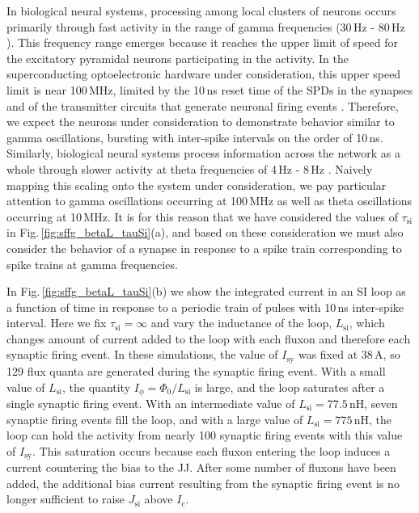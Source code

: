 \documentclass[twocolumn]{article}
\begin{document}
In biological neural systems, processing among local clusters of neurons occurs primarily through fast activity in the range of gamma frequencies (30\,Hz - 80\,Hz \cite{budr2004,bu2006}). This frequency range emerges because it reaches the upper limit of speed for the excitatory pyramidal neurons participating in the activity. In the superconducting optoelectronic hardware under consideration, this upper speed limit is near 100\,MHz, limited by the 10\,ns reset time of the SPDs in the synapses and of the transmitter circuits that generate neuronal firing events \cite{sh2018_full}. Therefore, we expect the neurons under consideration to demonstrate behavior similar to gamma oscillations, bursting with inter-spike intervals on the order of 10\,ns. Similarly, biological neural systems process information across the network as a whole through slower activity at theta frequencies of 4\,Hz - 8\,Hz \cite{budr2004,bu2006}. Naively mapping this scaling onto the system under consideration, we pay particular attention to gamma oscillations occurring at 100\,MHz as well as theta oscillations occurring at 10\,MHz. It is for this reason that we have considered the values of $\tau_{\mathrm{si}}$ in Fig.\,\ref{fig:sffg_betaL_tauSi}(a), and based on these consideration we must also consider the behavior of a synapse in response to a spike train corresponding to spike trains at gamma frequencies. 

In Fig.\,\ref{fig:sffg_betaL_tauSi}(b) we show the integrated current in an SI loop as a function of time in response to a periodic train of pulses with 10\,ns inter-spike interval. Here we fix $\tau_{\mathrm{si}} = \infty$ and vary the inductance of the loop, $L_{\mathrm{si}}$, which changes amount of current added to the loop with each fluxon and therefore each synaptic firing event. In these simulations, the value of $I_{\mathrm{sy}}$ was fixed at 38\,\textmu A, so 129 flux quanta are generated during the synaptic firing event. With a small value of $L_{\mathrm{si}}$, the quantity $I_{\phi} = \Phi_0/L_{\mathrm{si}}$ is large, and the loop saturates after a single synaptic firing event. With an intermediate value of $L_{\mathrm{si}} = 77.5$\,nH, seven synaptic firing events fill the loop, and with a large value of $L_{\mathrm{si}} = 775$\,nH, the loop can hold the activity from nearly 100 synaptic firing events with this value of $I_{\mathrm{sy}}$. This saturation occurs because each fluxon entering the loop induces a current countering the bias to the JJ. After some number of fluxons have been added, the additional bias current resulting from the synaptic firing event is no longer sufficient to raise $J_{\mathrm{si}}$ above $I_{\mathrm{c}}$. 
\end{document}
